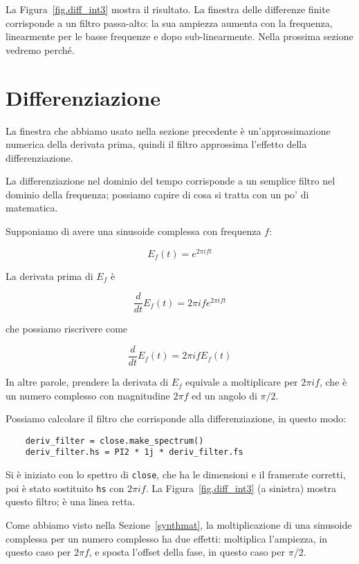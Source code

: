\documentclass[12pt]{book} \usepackage[width=5.5in,height=8.5in, hmarginratio=3:2,vmarginratio=1:1]{geometry}
\begin{document}
La Figura~\ref{fig.diff_int3} mostra il risultato. La finestra delle differenze finite corrisponde a un filtro passa-alto: la sua ampiezza aumenta con la frequenza, linearmente per le basse frequenze e dopo sub-linearmente. Nella prossima sezione vedremo perché.

\section{Differenziazione} \label{effdiff} 

La finestra che abbiamo usato nella sezione precedente è un'approssimazione numerica della derivata prima, quindi il filtro approssima l'effetto della differenziazione.

La differenziazione nel dominio del tempo corrisponde a un semplice filtro nel dominio della frequenza; possiamo capire di cosa si tratta con un po' di matematica.

Supponiamo di avere una sinusoide complessa con frequenza $f$:

%
\[ E_f(t) = e^{2 \pi i f t} \] 

%
La derivata prima di $E_f$ è

%
\[ \frac{d}{dt} E_f(t) = 2 \pi i f e^{2 \pi i f t} \] 

%
che possiamo riscrivere come

%
\[ \frac{d}{dt} E_f(t) = 2 \pi i f E_f(t) \] 

%
In altre parole, prendere la derivata di $E_f$ equivale a moltiplicare per $2 \pi i f$, che è un numero complesso con magnitudine $2 \pi f$ ed un angolo di $\pi/2$.

Possiamo calcolare il filtro che corrisponde alla differenziazione, in questo modo:

\begin{verbatim} 
    deriv_filter = close.make_spectrum()
    deriv_filter.hs = PI2 * 1j * deriv_filter.fs
 \end{verbatim} 

Si è iniziato con lo spettro di {\tt close}, che ha le dimensioni e il framerate corretti, poi è stato sostituito {\tt hs} con $2 \pi i f$. La Figura~\ref{fig.diff_int3} (a sinistra) mostra questo filtro; è una linea retta.

Come abbiamo visto nella Sezione~\ref{synthmat}, la moltiplicazione di una sinusoide complessa per un numero complesso ha due effetti: moltiplica l'ampiezza, in questo caso per $2 \pi f$, e sposta l'offset della fase, in questo caso per $\pi/2$.
\end{document}
